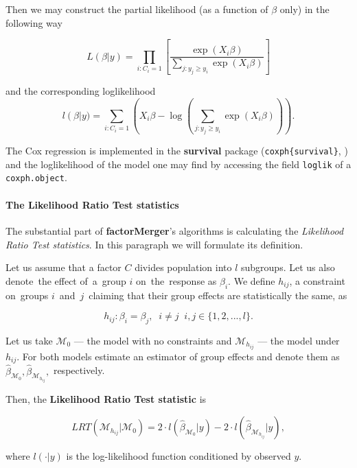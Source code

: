 \documentclass[12pt]{article}
\newcommand{\M}{\mathcal{M}}
\newcommand{\code}{\texttt}
\begin{document}
Then we may construct the partial likelihood (as a function of $\beta$ only) in the following way

$$L(\beta|y) = 
	\prod_{i: C_i = 1}
		\left[
			\frac{\exp{\left(X_i\beta\right)}}
					{\sum_{j: y_j \geq y_i} 
					\exp{\left(X_i\beta\right)}}
			\right]$$
			
and the corresponding loglikelihood
$$
l\left(\beta\right|y) = 
	\sum_{i:C_i = 1} 
		\left(
			X_i\beta -
			\log{
				\left(
				\sum_{j:y_j\geq y_i} 
				\exp{\left(X_i\beta\right)}		
				\right)
			}
		\right).
$$

The Cox regression is implemented in the \textbf{survival} package (\code{coxph\{survival\}}, \citealp{survival-book})
and the loglikelihood of the model one may find by accessing the field \code{loglik} of a \code{coxph.object}.

\paragraph{The Likelihood Ratio Test statistics}

The substantial part of \textbf{factorMerger}'s algorithms is calculating the \emph{Likelihood Ratio Test statistics}. In this paragraph we will formulate its definition.

Let us assume that a factor $C$ divides population into $l$ subgroups. Let us also denote~the effect of~a~group $i$ on~the~response as $\beta_i$. We define $h_{ij}$, a constraint on~groups $i$~and~$j$~claiming that their group effects are statistically the same, as

\begin{equation} \label{constraint}
h_{ij}: \beta_i = \beta_j, \;\; i \neq j \;\; i,j \in \{1, 2, ..., l \}.
\end{equation}


Let us take $\M_0$  --- the model with no constraints and $\M_{h_{ij}}$ --- the model under $h_{ij}$. For both models estimate an estimator of group effects and denote them as~$\hat{\beta}_{\M_0}, \hat{\beta}_{\M_{h_{ij}}},$ respectively.

Then, the \textbf{Likelihood Ratio Test statistic} is

\begin{equation} \label{LRTstat}
LRT(\M_{h_{ij}}|\M_0) = 2 \cdot l (\hat{\beta}_{\M_0}|y) - 2 \cdot l (\hat{\beta}_{\M_{h_{ij}}}|y), 
\end{equation}

where $l(\cdot|y)$ is the log-likelihood function conditioned by observed $y$.
\end{document}
